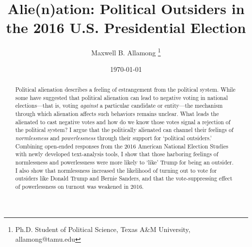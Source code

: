 \documentclass[12pt]{article}
\title{Alie(n)ation: Political Outsiders in the 2016 U.S. Presidential Election}
\author{Maxwell B. Allamong \thanks{Ph.D. Student of Political Science, Texas A\&M University, allamong@tamu.edu
} }
\date{\today}
\begin{document}
\maketitle
{}
\thispagestyle{empty}
\doublespacing





\begin{abstract} 
Political alienation describes a feeling of estrangement from the political system. While some have suggested that political alienation can lead to negative voting in national elections---that is, voting \textit{against} a particular candidate or entity---the mechanism through which alienation affects such behaviors remains unclear. What leads the alienated to cast negative votes and how do we know those votes signal a rejection of the political system? I argue that the politically alienated can channel their feelings of \textit{normlessness} and \textit{powerlessness} through their support for `political outsiders.' Combining open-ended responses from the 2016 American National Election Studies with newly developed text-analysis tools, I show that those harboring feelings of normlessness and powerlessness were more likely to `like' Trump for being an outsider. I also show that normlessness increased the likelihood of turning out to vote for outsiders like Donald Trump and Bernie Sanders, and that the vote-suppressing effect of powerlessness on turnout was weakened in 2016.
\end{abstract}\clearpage{}










\end{document}
